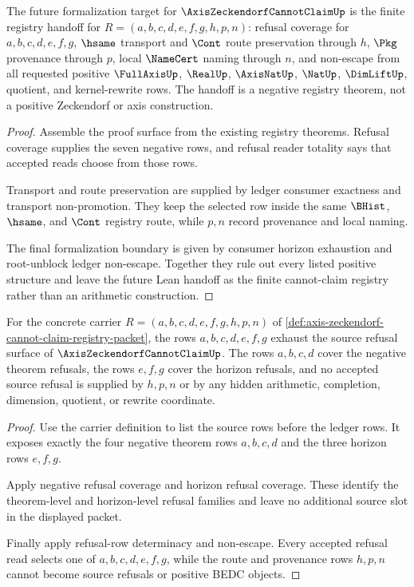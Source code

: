 \begin{theorem}
\label{thm:axis-zeckendorf-cannot-claim-formalization-handoff}
The future formalization target for $\AxisZeckendorfCannotClaimUp$ is the finite registry handoff for $R=(a,b,c,d,e,f,g,h,p,n)$: refusal coverage for $a,b,c,d,e,f,g$, $\hsame$ transport and $\Cont$ route preservation through $h$, $\Pkg$ provenance through $p$, local $\NameCert$ naming through $n$, and non-escape from all requested positive $\FullAxisUp$, $\RealUp$, $\AxisNatUp$, $\NatUp$, $\DimLiftUp$, quotient, and kernel-rewrite rows. The handoff is a negative registry theorem, not a positive Zeckendorf or axis construction.
\end{theorem}
\begin{proof}
Assemble the proof surface from the existing registry theorems. Refusal coverage supplies the seven negative rows, and refusal reader totality says that accepted reads choose from those rows.

Transport and route preservation are supplied by ledger consumer exactness and transport non-promotion. They keep the selected row inside the same $\BHist$, $\hsame$, and $\Cont$ registry route, while $p,n$ record provenance and local naming.

The final formalization boundary is given by consumer horizon exhaustion and root-unblock ledger non-escape. Together they rule out every listed positive structure and leave the future Lean handoff as the finite cannot-claim registry rather than an arithmetic construction.
\end{proof}

\begin{theorem}
\label{thm:axis-zeckendorf-cannot-claim-seven-row-coverage}
For the concrete carrier $R=(a,b,c,d,e,f,g,h,p,n)$ of \autoref{def:axis-zeckendorf-cannot-claim-registry-packet}, the rows $a,b,c,d,e,f,g$ exhaust the source refusal surface of $\AxisZeckendorfCannotClaimUp$. The rows $a,b,c,d$ cover the negative theorem refusals, the rows $e,f,g$ cover the horizon refusals, and no accepted source refusal is supplied by $h,p,n$ or by any hidden arithmetic, completion, dimension, quotient, or rewrite coordinate.
\end{theorem}
\begin{proof}
Use the carrier definition to list the source rows before the ledger rows. It exposes exactly the four negative theorem rows $a,b,c,d$ and the three horizon rows $e,f,g$.

Apply negative refusal coverage and horizon refusal coverage. These identify the theorem-level and horizon-level refusal families and leave no additional source slot in the displayed packet.

Finally apply refusal-row determinacy and non-escape. Every accepted refusal read selects one of $a,b,c,d,e,f,g$, while the route and provenance rows $h,p,n$ cannot become source refusals or positive BEDC objects.
\end{proof}

